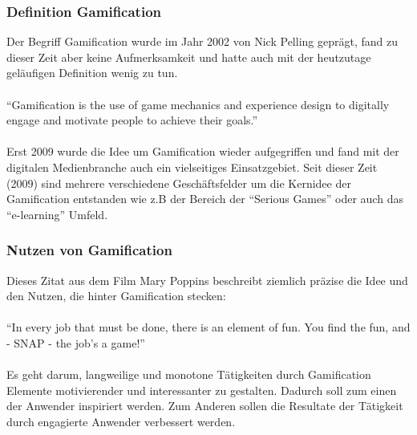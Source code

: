 \documentclass[a4paper,12pt]{scrartcl}
\begin{document}
\subsubsection{Definition Gamification}
Der Begriff Gamification wurde im Jahr 2002 von Nick Pelling geprägt, fand zu dieser Zeit aber keine Aufmerksamkeit und hatte auch mit der heutzutage geläufigen Definition wenig zu tun.
\\\\
\enquote{Gamification is the use of game mechanics and experience design to digitally engage and motivate people to achieve their goals.}\cite{gamificationDefinition}
\\\\
Erst 2009 wurde die Idee um Gamification wieder aufgegriffen und fand mit der digitalen Medienbranche auch ein vielseitiges Einsatzgebiet. Seit dieser Zeit (2009) sind mehrere verschiedene Geschäftsfelder um die Kernidee der Gamification entstanden wie z.B der Bereich der \enquote{Serious Games} oder auch das \enquote{e-learning} Umfeld.  

\subsubsection{Nutzen von Gamification}
Dieses Zitat aus dem Film Mary Poppins beschreibt ziemlich präzise die Idee und den Nutzen, die hinter Gamification stecken:\\\\ 
\enquote{In every job that must be done, there is an element of fun. You find the fun, and - SNAP - the job's a game!} \footnotemark
{} 
\\\\
Es geht darum, langweilige und monotone Tätigkeiten durch Gamification Elemente motivierender und interessanter zu gestalten. Dadurch soll zum einen der Anwender inspiriert werden. Zum Anderen sollen die Resultate der Tätigkeit durch engagierte Anwender verbessert werden.
\end{document}
